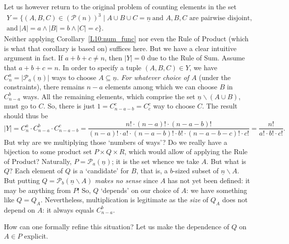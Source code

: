 \documentclass[12pt,notitlepage]{article}
\theoremstyle{plain}
\theoremstyle{definition}
\theoremstyle{plain}
\newcommand{\sbs}{\subseteq}
\renewcommand{\setminus}{\smallsetminus}
\newcommand{\mP}{\mathcal{P}}
\newcommand{\ul}[1]{\underline{#1}}
\newcommand{\1}{\mathbf{1}}
\newcommand{\0}{\mathbf{0}}
\begin{document}
Let us however return to the original problem of counting elements in the set 
\begin{multline*}
Y = \{ (A, B, C) \in (\mP(n))^3 \mid A \cup B \cup C = \ul{n}\ \mbox{and $A, B, C$ are pairwise disjoint,}\\ \mbox{and}\ |A| = a \wedge |B| = b \wedge |C| = c \}.
\end{multline*} 
Neither applying Corollary~\ref{L10:num_func} nor even the Rule of Product (which is what that corollary is based on) suffices here. But we have a clear intuitive argument in fact. If $a + b + c \neq n$, then $|Y| = 0$ due to the Rule of Sum. Assume that $a + b + c = n$. In order to specify a tuple $(A, B, C) \in Y$, we have $C_n^a = |\mP_a(\ul{n})|$ ways to choose $A \sbs \ul{n}$. \emph{For whatever choice of $A$} (under the constraints), there remains $n - a$ elements among which we can choose $B$ in $C_{n - a}^b$ ways. All the remaining elements, which comprise the set $\ul{n} \setminus (A \cup B)$, must go to $C$. So, there is just $1 = C_{n - a - b}^c = C_c^c$ way to choose $C$. The result should thus be
$$|Y| = C_n^a \cdot C_{n - a}^b \cdot C_{n - a - b}^c = \dfrac{n! \cdot (n - a)! \cdot (n - a - b)!}{(n - a)! \cdot a! \cdot (n - a - b)! \cdot b! \cdot (n - a - b - c)! \cdot c!} = \dfrac{n!}{a! \cdot b! \cdot c!}.$$
But why are we multiplying those `numbers of ways'? Do we really have a bijection to some product set $P \times Q \times R$, which would allow of applying the Rule of Product? Naturally, $P = \mP_a(\ul{n})$; it is the set whence we take $A$. But what is $Q$? Each element of $Q$ is a `candidate' for $B$, that is, a $b$-sized subset of $\ul{n} \setminus A$. But putting $Q = \mP_b(\ul{n} \setminus A)$ \emph{makes no sense} since $A$ has not yet been defined: it may be anything from $P$! So, $Q$ `depends' on our choice of $A$: we have something like $Q = Q_A$. Nevertheless, multiplication is legitimate as the \emph{size} of $Q_A$ does not depend on $A$: it always equals $C_{n - a}^b$.

How can one formally refine this situation? Let us make the dependence of $Q$ on $A \in P$ explicit.
\end{document}
